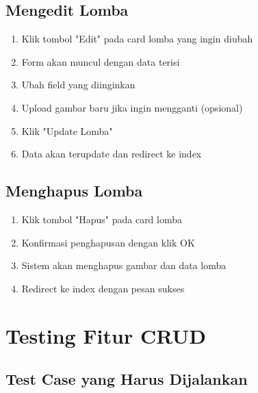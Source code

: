 \documentclass[12pt,a4paper]{article}
\begin{document}
\subsection{Mengedit Lomba}

\begin{enumerate}
    \item Klik tombol "Edit" pada card lomba yang ingin diubah
    \item Form akan muncul dengan data terisi
    \item Ubah field yang diinginkan
    \item Upload gambar baru jika ingin mengganti (opsional)
    \item Klik "Update Lomba"
    \item Data akan terupdate dan redirect ke index
\end{enumerate}

\subsection{Menghapus Lomba}

\begin{enumerate}
    \item Klik tombol "Hapus" pada card lomba
    \item Konfirmasi penghapusan dengan klik OK
    \item Sistem akan menghapus gambar dan data lomba
    \item Redirect ke index dengan pesan sukses
\end{enumerate}

\section{Testing Fitur CRUD}

\subsection{Test Case yang Harus Dijalankan}
\end{document}
